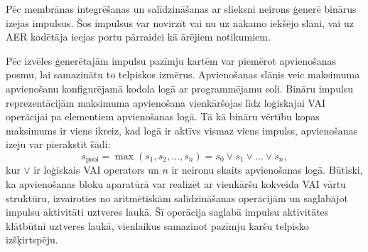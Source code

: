 Pēc membrānas integrēšanas un salīdzināšanas ar slieksni neirons ģenerē binārus izejas impulsus. Šos impulsus var novirzīt vai nu uz nākamo iekšējo slāni, vai uz AER kodētāja ieejas portu pārraidei kā ārējiem notikumiem.

Pēc izvēles ģenerētajām impulsu pazīmju kartēm var piemērot apvienošanas posmu, lai samazinātu to telpiskos izmērus. Apvienošanas slānis veic maksimuma apvienošanu konfigurējamā kodola logā ar programmējamu soli. Bināru impulsu reprezentācijām maksimuma apvienošana vienkāršojas līdz loģiskajai VAI operācijai pa elementiem apvienošanas logā. Tā kā bināru vērtību kopas maksimums ir viens ikreiz, kad logā ir aktīvs vismaz viens impulss, apvienošanas izeju var pierakstīt šādi:
\begin{equation}
  s_{\text{pool}} = \max(s_1, s_2, \ldots, s_n) = s_0 \vee s_1 \vee \ldots \vee s_n,
\end{equation}
kur \(\vee\) ir loģiskais VAI operators un \(n\) ir neironu skaits apvienošanas logā. Būtiski, ka apvienošanas bloku aparatūrā var realizēt ar vienkāršu kokveida VAI vārtu struktūru, izvairoties no aritmētiskām salīdzināšanas operācijām un saglabājot impulsu aktivitāti uztveres laukā. Šī operācija saglabā impulsu aktivitātes klātbūtni uztveres laukā, vienlaikus samazinot pazīmju karšu telpisko izšķirtspēju.


